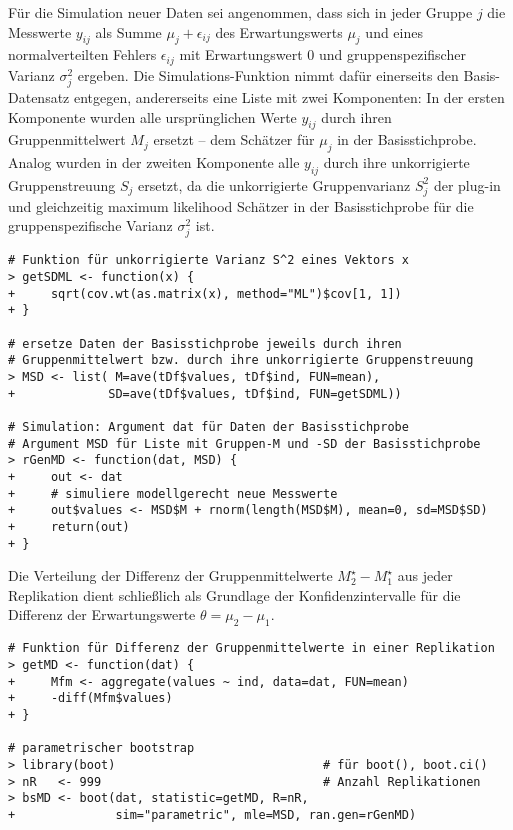 Für die Simulation neuer Daten sei angenommen, dass sich in jeder Gruppe $j$ die Messwerte $y_{ij}$ als Summe $\mu_{j} + \epsilon_{ij}$ des Erwartungswerts $\mu_{j}$ und eines normalverteilten Fehlers $\epsilon_{ij}$ mit Erwartungswert $0$ und gruppenspezifischer Varianz $\sigma_{j}^{2}$ ergeben. Die Simulations-Funktion nimmt dafür einerseits den Basis-Datensatz entgegen, andererseits eine Liste mit zwei Komponenten: In der ersten Komponente wurden alle ursprünglichen Werte $y_{ij}$ durch ihren Gruppenmittelwert $M_{j}$ ersetzt -- dem Schätzer für $\mu_{j}$ in der Basisstichprobe. Analog wurden in der zweiten Komponente alle $y_{ij}$ durch ihre unkorrigierte Gruppenstreuung $S_{j}$ ersetzt, da die unkorrigierte Gruppenvarianz $S_{j}^{2}$ der plug-in und gleichzeitig maximum likelihood Schätzer in der Basisstichprobe für die gruppenspezifische Varianz $\sigma_{j}^{2}$ ist.
\begin{lstlisting}
# Funktion für unkorrigierte Varianz S^2 eines Vektors x
> getSDML <- function(x) {
+     sqrt(cov.wt(as.matrix(x), method="ML")$cov[1, 1])
+ }

# ersetze Daten der Basisstichprobe jeweils durch ihren
# Gruppenmittelwert bzw. durch ihre unkorrigierte Gruppenstreuung
> MSD <- list( M=ave(tDf$values, tDf$ind, FUN=mean),
+             SD=ave(tDf$values, tDf$ind, FUN=getSDML))

# Simulation: Argument dat für Daten der Basisstichprobe
# Argument MSD für Liste mit Gruppen-M und -SD der Basisstichprobe
> rGenMD <- function(dat, MSD) {
+     out <- dat
+     # simuliere modellgerecht neue Messwerte
+     out$values <- MSD$M + rnorm(length(MSD$M), mean=0, sd=MSD$SD)
+     return(out)
+ }
\end{lstlisting}

Die Verteilung der Differenz der Gruppenmittelwerte $M_{2}^{\star}-M_{1}^{\star}$ aus jeder Replikation dient schließlich als Grundlage der Konfidenzintervalle für die Differenz der Erwartungswerte $\theta = \mu_{2}-\mu_{1}$.
\begin{lstlisting}
# Funktion für Differenz der Gruppenmittelwerte in einer Replikation
> getMD <- function(dat) {
+     Mfm <- aggregate(values ~ ind, data=dat, FUN=mean)
+     -diff(Mfm$values)
+ }

# parametrischer bootstrap
> library(boot)                             # für boot(), boot.ci()
> nR   <- 999                               # Anzahl Replikationen
> bsMD <- boot(dat, statistic=getMD, R=nR,
+              sim="parametric", mle=MSD, ran.gen=rGenMD)
\end{lstlisting}

